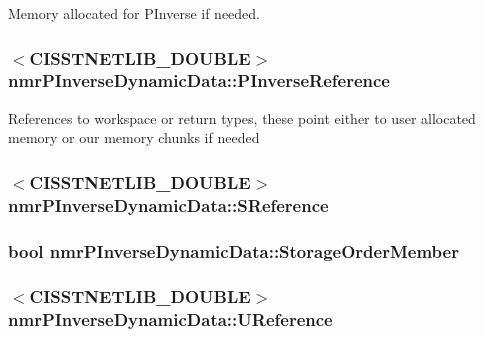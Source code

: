 Memory allocated for P\-Inverse if needed. \hypertarget{classnmr_p_inverse_dynamic_data_a14a45576194a4b72f980276df04b3fd8}{
\subsubsection[{P\-Inverse\-Reference}]{$<$C\-I\-S\-S\-T\-N\-E\-T\-L\-I\-B\-\_\-\-D\-O\-U\-B\-L\-E$>$ nmr\-P\-Inverse\-Dynamic\-Data\-::\-P\-Inverse\-Reference\hspace{0.3cm}{\ttfamily [protected]}}}\label{classnmr_p_inverse_dynamic_data_a14a45576194a4b72f980276df04b3fd8}
References to workspace or return types, these point either to user allocated memory or our memory chunks if needed \hypertarget{classnmr_p_inverse_dynamic_data_a7d2da272cbc56f92c25264181b319330}{
\subsubsection[{S\-Reference}]{$<$C\-I\-S\-S\-T\-N\-E\-T\-L\-I\-B\-\_\-\-D\-O\-U\-B\-L\-E$>$ nmr\-P\-Inverse\-Dynamic\-Data\-::\-S\-Reference\hspace{0.3cm}{\ttfamily [protected]}}}\label{classnmr_p_inverse_dynamic_data_a7d2da272cbc56f92c25264181b319330}
\hypertarget{classnmr_p_inverse_dynamic_data_aa4810eb93febb93966e173a81b32f1ff}{
\subsubsection[{Storage\-Order\-Member}]{\setlength{\rightskip}{0pt plus 5cm}bool nmr\-P\-Inverse\-Dynamic\-Data\-::\-Storage\-Order\-Member\hspace{0.3cm}{\ttfamily [protected]}}}\label{classnmr_p_inverse_dynamic_data_aa4810eb93febb93966e173a81b32f1ff}
\hypertarget{classnmr_p_inverse_dynamic_data_a6241a303eaf9bfaf0d0c705690855d55}{
\subsubsection[{U\-Reference}]{$<$C\-I\-S\-S\-T\-N\-E\-T\-L\-I\-B\-\_\-\-D\-O\-U\-B\-L\-E$>$ nmr\-P\-Inverse\-Dynamic\-Data\-::\-U\-Reference\hspace{0.3cm}{\ttfamily [protected]}}}\label{classnmr_p_inverse_dynamic_data_a6241a303eaf9bfaf0d0c705690855d55}
